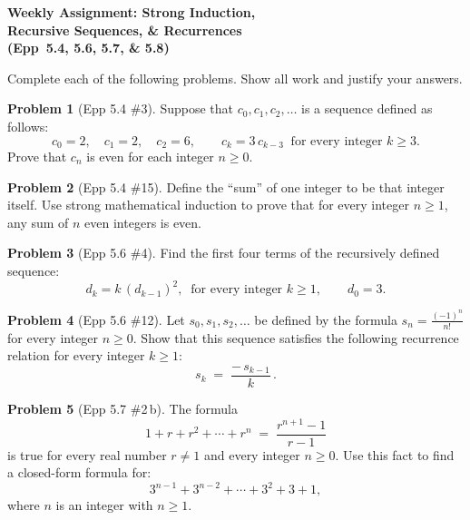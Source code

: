 \documentclass[11pt]{article}
\begin{document}
\begin{center}
  {\Large\bfseries Weekly Assignment: Strong Induction,\\[2pt]
   Recursive Sequences, \& Recurrences\\[2pt]
   (Epp~5.4, 5.6, 5.7, \& 5.8)}
\end{center}

\bigskip

\noindent
Complete each of the following problems.  Show all work and justify your answers.

\bigskip

\noindent\textbf{Problem 1} (Epp 5.4 \#3). \;
Suppose that $c_0, c_1, c_2, \ldots$ is a sequence defined as
follows:
\[
  c_0 = 2,\quad c_1 = 2,\quad c_2 = 6,\qquad
  c_k = 3\,c_{k-3} \;\;\text{for every integer } k \ge 3.
\]
Prove that $c_n$ is even for each integer $n \ge 0$.

\bigskip

\noindent\textbf{Problem 2} (Epp 5.4 \#15). \;
Define the ``sum'' of one integer to be that integer itself.
Use strong mathematical induction to prove that for every
integer $n \ge 1$, any sum of $n$ even integers is even.

\bigskip

\noindent\textbf{Problem 3} (Epp 5.6 \#4). \;
Find the first four terms of the recursively defined
sequence:
\[
  d_k = k\,(d_{k-1})^2, \;\;\text{for every integer } k \ge 1,
  \qquad d_0 = 3.
\]

\bigskip

\noindent\textbf{Problem 4} (Epp 5.6 \#12). \;
Let $s_0, s_1, s_2, \ldots$ be defined by the formula
$\displaystyle s_n = \frac{(-1)^n}{n!}$
for every integer $n \ge 0$.  Show that this sequence
satisfies the following recurrence relation for every
integer $k \ge 1$:
\[
  s_k \;=\; \frac{-\,s_{k-1}}{k}\,.
\]

\bigskip

\noindent\textbf{Problem 5} (Epp 5.7 \#2\,b). \;
The formula
\[
  1 + r + r^2 + \cdots + r^n \;=\; \frac{r^{n+1} - 1}{r - 1}
\]
is true for every real number $r \ne 1$ and every integer
$n \ge 0$.  Use this fact to find a closed-form formula for:
\[
  3^{n-1} + 3^{n-2} + \cdots + 3^2 + 3 + 1,
\]
where $n$ is an integer with $n \ge 1$.

\bigskip
\end{document}
